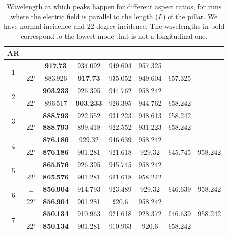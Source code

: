 \begin{table}
    \centering
      \caption{Wavelength at which peaks happen for different aspect ratios, for runs where the electric
      field is parallel to the length ($L$) of the pillar. We have normal incidence and 22-degree incidence.
      The wavelengths in bold correspond to the lowest mode that is not a longitudinal one.}
      \label{tab:ar_peaks}
      \begin{tabular}{c c c c c c c c}
        \textbf{AR} \\
        \hline
        \multirow{2}{*}{1} & $\perp$ & \textbf{917.73} & 934.092 & 949.604 & 957.325 \\ %
        & 22$^{\circ}$ & 883.926 & \textbf{917.73} & 935.052 & 949.604 & 957.325 \\ %
        \hline
        \multirow{2}{*}{2} & $\perp$ & \textbf{903.233} & 926.395 & 944.762 & 958.242 \\ %
        & 22$^{\circ}$ & 896.517 & \textbf{903.233} & 926.395 & 944.762 & 958.242 \\ %
        \hline
        \multirow{2}{*}{3} & $\perp$ & \textbf{888.793} & 922.552 & 931.223 & 948.613 & 958.242 \\ %
        & 22$^{\circ}$ & \textbf{888.793} & 899.418 & 922.552 & 931.223 & 958.242 \\ %
        \hline
        \multirow{2}{*}{4} & $\perp$ & \textbf{876.186} & 929.32 & 946.639 & 958.242 \\ %
        & 22$^{\circ}$ & \textbf{876.186} & 901.281 & 921.618 & 929.32 & 945.745 & 958.242 \\ %
        \hline
        \multirow{2}{*}{5} & $\perp$ & \textbf{865.576} & 926.395 & 945.745 & 958.242 \\ %
        & 22$^{\circ}$ & \textbf{865.576} & 901.281 & 921.618 & 958.242 \\ %
        \hline
        \multirow{2}{*}{6} & $\perp$ &  \textbf{856.904} & 914.793 & 923.489 & 929.32 & 946.639 & 958.242\\ %
        & 22$^{\circ}$ & \textbf{856.904} & 901.281 & 920.6 & 958.242\\ %
        \hline
        \multirow{2}{*}{7} & $\perp$ &  \textbf{850.134} & 910.963 & 921.618 & 928.372 & 946.639 & 958.242 \\ %
        & 22$^{\circ}$ & \textbf{850.134} & 901.281 & 910.963 & 920.6 & 958.242\\ %
        \hline
      \end{tabular}
\end{table}

